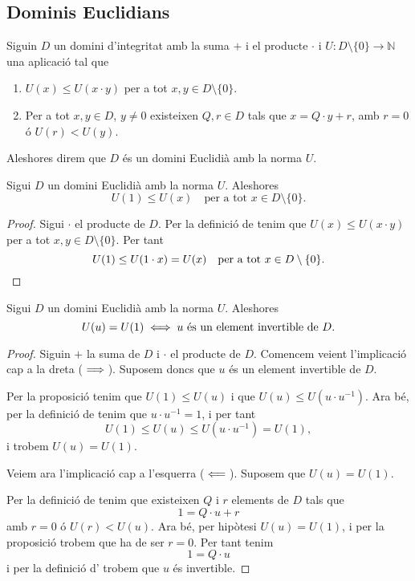 \documentclass[../Apunts.tex]{subfiles}
\begin{document}
	\subsection{Dominis Euclidians}
	\begin{definition}
		\label{def:domini Euclidià}
		\label{def:DE}
		Siguin \(D\) un domini d'integritat amb la suma \(+\) i el producte \(\cdot\) i \(U\colon D\setminus\{0\}\longrightarrow\mathbb{N}\) una aplicació tal que
		\begin{enumerate}
			\item \(U(x)\leq U(x\cdot y)\) per a tot \(x,y\in D\setminus\{0\}\).
			\item Per a tot \(x,y\in D\), \(y\neq0\) existeixen \(Q,r\in D\) tals que \(x=Q\cdot y+r\), amb \(r=0\) ó \(U(r)<U(y)\).
		\end{enumerate}
		Aleshores direm que \(D\) és un domini Euclidià amb la norma \(U\).
	\end{definition}
	\begin{proposition}
		\label{prop:norma de 1 és la més petita en DE}
		Sigui \(D\) un domini Euclidià amb la norma \(U\). Aleshores
		\[U(1)\leq U(x)\quad\text{per a tot }x\in D\setminus\{0\}.\]
		\begin{proof}
			Sigui \(\cdot\) el producte de \(D\). Per la definició de  tenim que \(U(x)\leq U(x\cdot y)\) per a tot \(x,y\in D\setminus\{0\}\). Per tant
			\[U(1)\leq U(1\cdot x)=U(x)\quad\text{per a tot }x\in D\setminus\{0\}.\qedhere\]
		\end{proof}
	\end{proposition}
	\begin{proposition}
		Sigui \(D\) un domini Euclidià amb la norma \(U\). Aleshores
		\[U(u)=U(1)\iff u\text{ és un element invertible de }D.\]
		\begin{proof}			
			Siguin \(+\) la suma de \(D\) i \(\cdot\) el producte de \(D\). Comencem veient l'implicació cap a la dreta (\(\implies\)). Suposem doncs que \(u\) és un element invertible de \(D\).
			
			Per la proposició  tenim que \(U(1)\leq U(u)\) i que \(U(u)\leq U(u\cdot u^{-1})\). Ara bé, per la definició de  tenim que \(u\cdot u^{-1}=1\), i per tant
			\[U(1)\leq U(u)\leq U(u\cdot u^{-1})=U(1),\]
			i trobem \(U(u)=U(1)\).
			
			Veiem ara l'implicació cap a l'esquerra (\(\impliedby\)). Suposem que \(U(u)=U(1)\).
			
			Per la definició de  tenim que existeixen \(Q\) i \(r\) elements de \(D\) tals que
			\[1=Q\cdot u+r\]
			amb \(r=0\) ó \(U(r)<U(u)\). Ara bé, per hipòtesi \(U(u)=U(1)\), i per la proposició  trobem que ha de ser \(r=0\). Per tant tenim
			\[1=Q\cdot u\]
			i per la definició d' trobem que \(u\) és invertible.
		\end{proof}
	\end{proposition}
\end{document}
